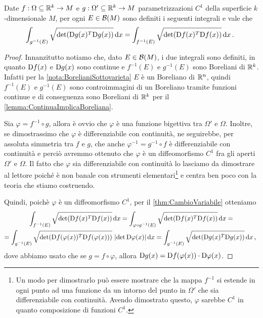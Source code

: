 \begin{lemma}\label{lemma:InvarianzaImmersione}
	Date $f:\Omega\subseteq\mathbb R^k\to M$ e $g:\Omega'\subseteq\mathbb R^k\to M$ parametrizzazioni $C^1$ della superficie $k$-dimensionale $M$, per ogni $E\in\mathcal B(M)$ sono definiti i seguenti integrali e vale che 
	\begin{equation*}
		\int_{g^{-1}(E)}\sqrt{\det(\mathrm D g(x)^T\mathrm D g(x))}\,\mathrm d x=\int_{f^{-1}(E)}\sqrt{\det(\mathrm D f(x)^T\mathrm D f(x))}\,\mathrm d x\, \text{. }
	\end{equation*}
\end{lemma}
\begin{proof}
	Innanzitutto notiamo che, dato $E\in\mathcal B(M)$, i due integrali sono definiti, in quanto $\mathrm D f(x)$ e $\mathrm D g(x)$ sono continue e $f^{-1}(E)$ e $g^{-1}(E)$ sono Boreliani di $\mathbb R^k$. Infatti per la \cref{nota:BorelianiSottovarieta} $E$ è un Boreliano di $\mathbb R^n$, quindi $f^{-1}(E)$ e $g^{-1}(E)$ sono controimmagini di un Boreliano tramite funzioni continue e di conseguenza sono Boreliani di $\mathbb R^k$ per il \cref{lemma:ContinuaImplicaBoreliana}.

	Sia $\varphi=f^{-1}\circ g$, allora è ovvio che $\varphi$ è una funzione bigettiva tra $\Omega'$ e $\Omega$. Inoltre, se dimostrassimo che $\varphi$ è differenziabile con continuità,  ne seguirebbe, per assoluta simmetria tra $f$ e $g$, che anche $\varphi^{-1}=g^{-1}\circ f$ è differenziabile con continuità e perciò avremmo ottenuto che $\varphi$ è un diffeomorfismo $C^1$ fra gli aperti $\Omega'$ e $\Omega$. Il fatto che $\varphi$ sia differenziabile con continuità lo lasciamo da dimostrare al lettore poiché è non banale con strumenti elementari\footnote{Un modo per dimostrarlo può essere mostrare che la mappa $f^{-1}$ si estende in ogni punto ad una funzione da un intorno del punto in $\Omega'$ che sia differenziabile con continuità. Avendo dimostrato questo, $\varphi$ sarebbe $C^1$ in quanto composizione di funzioni $C^1$.} e centra ben poco con la teoria che stiamo costruendo.
	
	Quindi, poichè $\varphi$ è un diffeomorfismo $C^1$, per il \cref{thm:CambioVariabile} otteniamo
	\begin{multline*}
		\int_{f^{-1}(E)}\sqrt{\det(\mathrm D f(x)^T\mathrm D f(x))}\,\mathrm d x=\int_{\varphi\circ g^{-1}(E)}\sqrt{\det(\mathrm D f(x)^T\mathrm D f(x))}\,\mathrm d x=\\
		=\int_{g^{-1}(E)}\sqrt{\det(\mathrm D f(\varphi(x))^T\mathrm D f(\varphi(x)))}\ \lvert\det \mathrm D \varphi(x)\rvert\,\mathrm d x=\int_{g^{-1}(E)}\sqrt{\det(\mathrm D g(x)^T\mathrm D g(x))}\,\mathrm d x\, \text{, }
	\end{multline*}
	dove abbiamo usato che se $g=f\circ \varphi$, allora $\mathrm D g(x)=\mathrm D f(\varphi(x))\cdot \mathrm D\varphi(x)$.
\end{proof}

